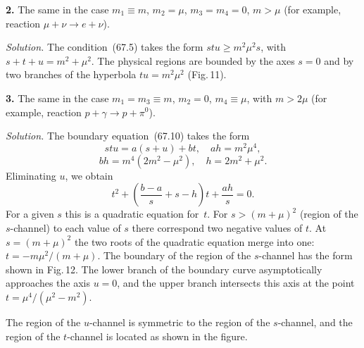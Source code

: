 \textbf{2.} The same in the case $m_1 \equiv m$, $m_2 = \mu$, $m_3 = m_4 = 0$, $m > \mu$ (for example, reaction $\mu + \nu \to e + \nu$).

\textit{Solution.} The condition~(67.5) takes the form $stu \geqslant m^2\mu^2 s$, with $s + t + u = m^2 + \mu^2$. The physical regions are bounded by the axes $s = 0$ and by two branches of the hyperbola $tu = m^2\mu^2$ (Fig.\,11).

\textbf{3.} The same in the case $m_1 = m_3 \equiv m$, $m_2 = 0$, $m_4 \equiv \mu$, with $m > 2\mu$ (for example, reaction $p + \gamma \to p + \pi^0$).

\textit{Solution.} The boundary equation~(67.10) takes the form
\[
stu = a(s + u) + bt,\quad ah = m^2\mu^4,
\]
\[
bh = m^4(2m^2 - \mu^2),\quad h = 2m^2 + \mu^2.
\]
Eliminating $u$, we obtain
\[
t^2 + \left(\frac{b - a}{s} + s - h\right)t + \frac{ah}{s} = 0.
\]
For a given $s$ this is a quadratic equation for~$t$. For $s > (m + \mu)^2$ (region of the $s$-channel) to each value of $s$ there correspond two negative values of $t$. At $s = (m + \mu)^2$ the two roots of the quadratic equation merge into one: $t = -m\mu^2/(m + \mu)$. The boundary of the region of the $s$-channel has the form shown in Fig.\,12. The lower branch of the boundary curve asymptotically approaches the axis $u = 0$, and the upper branch intersects this axis at the point $t = \mu^4/(\mu^2 - m^2)$.

The region of the $u$-channel is symmetric to the region of the $s$-channel, and the region of the $t$-channel is located as shown in the figure.
